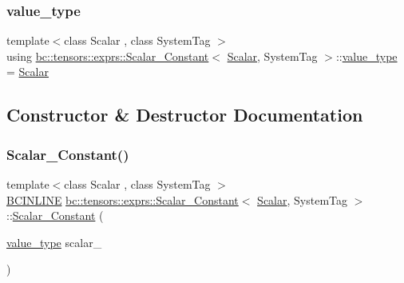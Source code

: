 \mbox{\label{structbc_1_1tensors_1_1exprs_1_1Scalar__Constant_a5ff7d788cce7d13ba21b5a421cb53036}} 
\subsubsection{\texorpdfstring{value\+\_\+type}{value\_type}}
{\footnotesize\ttfamily template$<$class Scalar , class System\+Tag $>$ \\
using \hyperlink{structbc_1_1tensors_1_1exprs_1_1Scalar__Constant}{bc\+::tensors\+::exprs\+::\+Scalar\+\_\+\+Constant}$<$ \hyperlink{namespacebc_aa12ac55ee2c43dc082894dd3859daee1}{Scalar}, System\+Tag $>$\+::\hyperlink{structbc_1_1Shape_3_010_01_4_a342cb50fc2de91d730a07750321bf986}{value\+\_\+type} =  \hyperlink{namespacebc_aa12ac55ee2c43dc082894dd3859daee1}{Scalar}}



\subsection{Constructor \& Destructor Documentation}
\mbox{\label{structbc_1_1tensors_1_1exprs_1_1Scalar__Constant_a1543669f3bcf2c429d7fc1b15901c35e}} 
\subsubsection{\texorpdfstring{Scalar\+\_\+\+Constant()}{Scalar\_Constant()}}
{\footnotesize\ttfamily template$<$class Scalar , class System\+Tag $>$ \\
\hyperlink{common_8h_a6699e8b0449da5c0fafb878e59c1d4b1}{B\+C\+I\+N\+L\+I\+NE} \hyperlink{structbc_1_1tensors_1_1exprs_1_1Scalar__Constant}{bc\+::tensors\+::exprs\+::\+Scalar\+\_\+\+Constant}$<$ \hyperlink{namespacebc_aa12ac55ee2c43dc082894dd3859daee1}{Scalar}, System\+Tag $>$\+::\hyperlink{structbc_1_1tensors_1_1exprs_1_1Scalar__Constant}{Scalar\+\_\+\+Constant} (\begin{DoxyParamCaption}\item[{\hyperlink{structbc_1_1Shape_3_010_01_4_a342cb50fc2de91d730a07750321bf986}{value\+\_\+type}}]{scalar\+\_\+ }\end{DoxyParamCaption})\hspace{0.3cm}{\ttfamily [inline]}}



